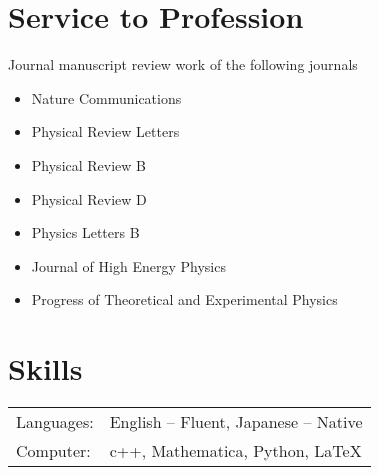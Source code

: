 \documentclass[12pt]{article}
\begin{document}
\section*{Service to Profession}
\vspace*{1em}
Journal manuscript review work of the following journals
\begin{itemize}
  \setlength\itemsep{0em}
  \item Nature Communications
  \item Physical Review Letters
  \item Physical Review B
  \item Physical Review D
  \item Physics Letters B
  \item Journal of High Energy Physics
  \item Progress of Theoretical and Experimental Physics
\end{itemize}

\section*{Skills}
\begin{table}[H]
  \begin{tabular}{lp{6in}}
    Languages: & English -- Fluent, Japanese -- Native \\
    Computer: & c++, Mathematica, Python, LaTeX
  \end{tabular}
\end{table}
\end{document}
